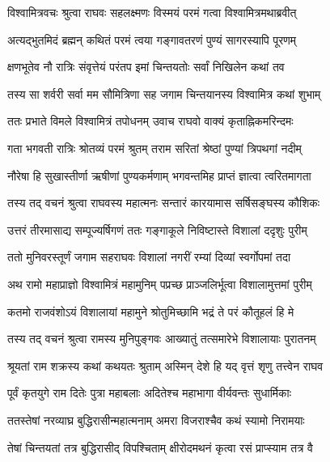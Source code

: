 
\twolineshloka
{विश्वामित्रवचः श्रुत्वा राघवः सहलक्ष्मणः}
{विस्मयं परमं गत्वा विश्वामित्रमथाब्रवीत्} %

\twolineshloka
{अत्यद्भुतमिदं ब्रह्मन् कथितं परमं त्वया}
{गङ्गावतरणं पुण्यं सागरस्यापि पूरणम्} %

\twolineshloka
{क्षणभूतेव नौ रात्रिः संवृत्तेयं परंतप}
{इमां चिन्तयतोः सर्वां निखिलेन कथां तव} %

\twolineshloka
{तस्य सा शर्वरी सर्वा मम सौमित्रिणा सह}
{जगाम चिन्तयानस्य विश्वामित्र कथां शुभाम्} %

\twolineshloka
{ततः प्रभाते विमले विश्वामित्रं तपोधनम्}
{उवाच राघवो वाक्यं कृताह्निकमरिन्दमः} %

\twolineshloka
{गता भगवती रात्रिः श्रोतव्यं परमं श्रुतम्}
{तराम सरितां श्रेष्ठां पुण्यां त्रिपथगां नदीम्} %

\twolineshloka
{नौरेषा हि सुखास्तीर्णा ऋषीणां पुण्यकर्मणाम्}
{भगवन्तमिह प्राप्तं ज्ञात्वा त्वरितमागता} %

\twolineshloka
{तस्य तद् वचनं श्रुत्वा राघवस्य महात्मनः}
{सन्तारं कारयामास सर्षिसङ्घस्य कौशिकः} %

\twolineshloka
{उत्तरं तीरमासाद्य सम्पूज्यर्षिगणं ततः}
{गङ्गाकूले निविष्टास्ते विशालां ददृशुः पुरीम्} %

\twolineshloka
{ततो मुनिवरस्तूर्णं जगाम सहराघवः}
{विशालां नगरीं रम्यां दिव्यां स्वर्गोपमां तदा} %

\twolineshloka
{अथ रामो महाप्राज्ञो विश्वामित्रं महामुनिम्}
{पप्रच्छ प्राञ्जलिर्भूत्वा विशालामुत्तमां पुरीम्} %

\twolineshloka
{कतमो राजवंशोऽयं विशालायां महामुने}
{श्रोतुमिच्छामि भद्रं ते परं कौतूहलं हि मे} %

\twolineshloka
{तस्य तद् वचनं श्रुत्वा रामस्य मुनिपुङ्गवः}
{आख्यातुं तत्समारेभे विशालायाः पुरातनम्} %

\twolineshloka
{श्रूयतां राम शक्रस्य कथां कथयतः श्रुताम्}
{अस्मिन् देशे हि यद् वृत्तं शृणु तत्त्वेन राघव} %

\twolineshloka
{पूर्वं कृतयुगे राम दितेः पुत्रा महाबलाः}
{अदितेश्च महाभागा वीर्यवन्तः सुधार्मिकाः} %

\twolineshloka
{ततस्तेषां नरव्याघ्र बुद्धिरासीन्महात्मनाम्}
{अमरा विजराश्चैव कथं स्यामो निरामयाः} %

\twolineshloka
{तेषां चिन्तयतां तत्र बुद्धिरासीद् विपश्चिताम्}
{क्षीरोदमथनं कृत्वा रसं प्राप्स्याम तत्र वै} %

